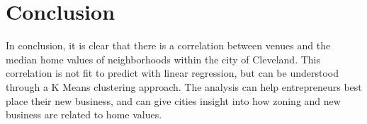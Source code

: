 \documentclass[twoside,14pt]{report}
\begin{document}
\chapter*{Conclusion}
In conclusion, it is clear that there is a correlation between venues and the median home values of neighborhoods within the city of Cleveland.  This correlation is not fit to predict with linear regression, but can be understood through a K Means clustering approach.  The analysis can help entrepreneurs best place their new business, and can give cities insight into how zoning and new business are related to home values. 
\end{document}
